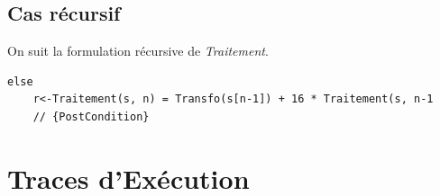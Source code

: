 \documentclass[a4paper, 11pt, oneside]{article}
\begin{document}
\subsection{Cas récursif}


On suit la formulation récursive de \textit{Traitement}.

\begin{lstlisting}
else
    r<-Traitement(s, n) = Transfo(s[n-1]) + 16 * Traitement(s, n-1
    // {PostCondition}
\end{lstlisting}



\section{Traces d'Exécution}\label{traces}
%
%

\end{document}
